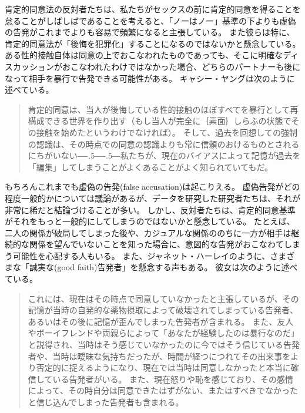 \documentclass[paper=a4,book,openany]{jlreq}
\def\DDASH{―\kern-.5\zw―\kern-.5\zw―} %
\begin{document}
肯定的同意法の反対者たちは、私たちがセックスの前に肯定的同意を得ることを怠ることがしばしばであることを考えると、「ノーはノー」基準の下よりも虚偽の告発がこれまでよりも容易で頻繁になると主張している。
また彼らは特に、肯定的同意法が「後悔を犯罪化」することになるのではないかと懸念している。
ある性的接触自体は同意の上でおこなわれたものであっても、そこに明確なディスカッションがおこなわれたわけではなかった場合、どちらのパートナーも後になって相手を暴行で告発できる可能性がある。
キャシー・ヤングは次のように述べている。

\begin{quote}
肯定的同意は、当人が後悔している性的接触のほぼすべてを暴行として再構成できる世界を作り出す（もし当人が完全に｛素面｝{しらふ}の状態でその接触を始めたというわけでなければ）。
そして、過去を回想しての強制の認識は、その時点での同意の認識よりも常に信頼のおけるものとされるにちがいない{\DDASH}私たちが、現在のバイアスによって記憶が過去を「編集」してしまうことがよくあることがよく知られていてもだ。
\citep{young15:_femin_want_us_defin_these}
\end{quote}

もちろんこれまでも虚偽の告発(false accusation)は起こりえる。
虚偽告発がどの程度一般的かについては議論があるが、データを研究した研究者たちは、それが非常に稀だと結論づけることが多い\citep{ferguson16:_asses_polic_class_sexual_assaul_repor}。
しかし、反対者たちは、肯定的同意基準がそれをもっと一般的にしてしまうのではないかと懸念している。
たとえば、二人の関係が破局してしまった後や、カジュアルな関係ののちに一方が相手は継続的な関係を望んでいないことを知った場合に、意図的な告発がおこなわてしまう可能性を心配する人もいる。
また、ジャネット・ハーレイのように、さまざまな「誠実な(good faith)告発者」を懸念する声もある。
彼女は次のように述べている。

\begin{quote}
これには、現在はその時点で同意していなかったと主張しているが、その記憶が当時の自発的な薬物摂取によって破壊されてしまっている告発者、あるいはその後に記憶が歪んでしまった告発者が含まれる。
また、友人やボーイフレンドや両親らによって「あなたが経験したのは暴行なのだ」と説得され、当時はそう感じていなかったのに今ではそう信じている告発者や、当時は曖昧な気持ちだったが、時間が経つにつれてその出来事をより否定的に捉えるようになり、現在では当時は同意しなかったと本当に確信している告発者がいる。
また、現在怒りや恥を感じており、その感情によって、その時自分は同意できたはずがない、またはすべきでなかったと信じ込んでしまった告発者も含まれる。
\citep[p.272]{halley16:_move_affir_consen}
\end{quote}
\end{document}
